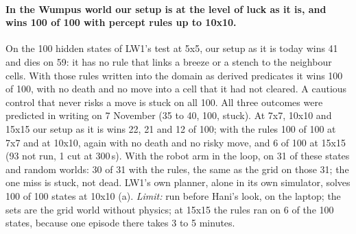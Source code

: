 \paragraph{In the Wumpus world our setup is at the level of luck as it is, and wins 100 of 100 with percept rules up to 10x10.}
On the 100 hidden states of LW1's test at 5x5, our setup as it is today wins 41 and dies on 59: it has no rule
that links a breeze or a stench to the neighbour cells. With those rules written into the domain as derived
predicates it wins 100 of 100, with no death and no move into a cell that it had not cleared. A cautious control
that never risks a move is stuck on all 100. All three outcomes were predicted in writing on 7 November (35 to
40, 100, stuck). At 7x7, 10x10 and 15x15 our setup as it is wins 22, 21 and 12 of 100; with the rules 100 of 100
at 7x7 and at 10x10, again with no death and no risky move, and 6 of 100 at 15x15 (93 not run, 1 cut at 300\,s).
With the robot arm in the loop, on 31 of these states and random worlds: 30 of 31 with the rules, the same as the
grid on those 31; the one miss is stuck, not dead. LW1's own planner, alone in its own simulator, solves 100 of
100 states at 10x10 (a).
\emph{Limit:} run before Hani's look, on the laptop; the sets are the grid world without physics; at 15x15 the
rules ran on 6 of the 100 states, because one episode there takes 3 to 5 minutes.

